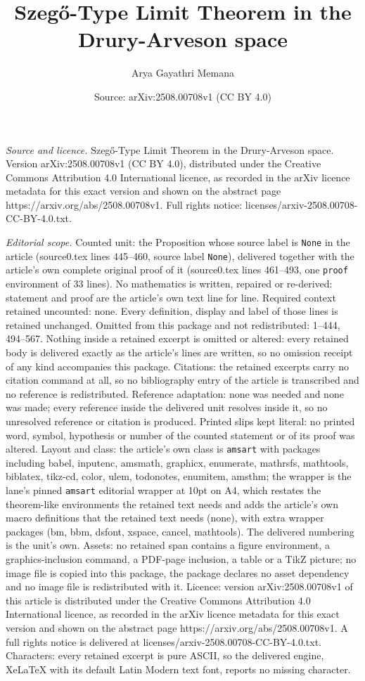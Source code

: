 \documentclass[10pt,a4paper]{amsart}
\title[Szeg\H{o}-Type Limit Theorem in the Drury-Arveson space]{Szeg\H{o}-Type Limit Theorem in the Drury-Arveson space}
\author{Arya Gayathri Memana}
\date{Source: arXiv:2508.00708v1 (CC BY 4.0)}
\begin{document}
\maketitle

\noindent\emph{Source and licence.} Szeg\H{o}-Type Limit Theorem in the Drury-Arveson space. Version arXiv:2508.00708v1 (CC BY 4.0), distributed under the Creative Commons Attribution 4.0 International licence, as recorded in the arXiv licence metadata for this exact version and shown on the abstract page https://arxiv.org/abs/2508.00708v1. Full rights notice: licenses/arxiv-2508.00708-CC-BY-4.0.txt.\par\smallskip

\noindent\textit{Editorial scope.} Counted unit: the Proposition whose source label is \texttt{None} in the article (source0.tex lines 445--460, source label \texttt{None}), delivered together with the article's own complete original proof of it (source0.tex lines 461--493, one \texttt{proof} environment of 33 lines). No mathematics is written, repaired or re-derived: statement and proof are the article's own text line for line. Required context retained uncounted: none. Every definition, display and label of those lines is retained unchanged. Omitted from this package and not redistributed: 1--444, 494--567. Nothing inside a retained excerpt is omitted or altered: every retained body is delivered exactly as the article's lines are written, so no omission receipt of any kind accompanies this package. Citations: the retained excerpts carry no citation command at all, so no bibliography entry of the article is transcribed and no reference is redistributed. Reference adaptation: none was needed and none was made; every reference inside the delivered unit resolves inside it, so no unresolved reference or citation is produced. Printed slips kept literal: no printed word, symbol, hypothesis or number of the counted statement or of its proof was altered. Layout and class: the article's own class is \texttt{amsart} with packages including babel, inputenc, amsmath, graphicx, enumerate, mathrsfs, mathtools, biblatex, tikz-cd, color, ulem, todonotes, enumitem, amsthm; the wrapper is the lane's pinned \texttt{amsart} editorial wrapper at 10pt on A4, which restates the theorem-like environments the retained text needs and adds the article's own macro definitions that the retained text needs (none), with extra wrapper packages (bm, bbm, dsfont, xspace, cancel, mathtools). The delivered numbering is the unit's own. Assets: no retained span contains a figure environment, a graphics-inclusion command, a PDF-page inclusion, a table or a TikZ picture; no image file is copied into this package, the package declares no asset dependency and no image file is redistributed with it. Licence: version arXiv:2508.00708v1 of this article is distributed under the Creative Commons Attribution 4.0 International licence, as recorded in the arXiv licence metadata for this exact version and shown on the abstract page https://arxiv.org/abs/2508.00708v1. A full rights notice is delivered at licenses/arxiv-2508.00708-CC-BY-4.0.txt. Characters: every retained excerpt is pure ASCII, so the delivered engine, XeLaTeX with its default Latin Modern text font, reports no missing character.
\end{document}
